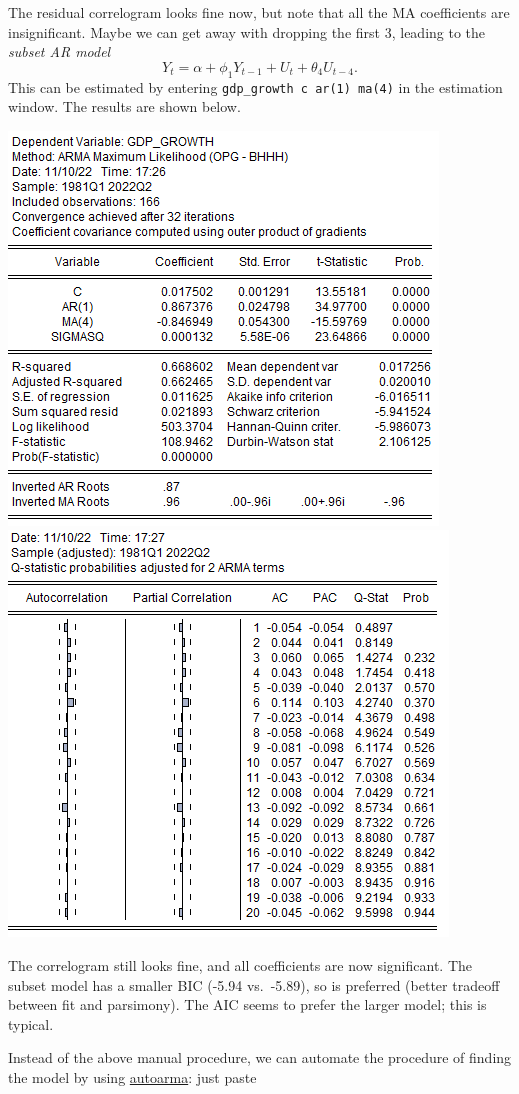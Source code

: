\documentclass[11pt, a4paper]{article}
\begin{document}
\begin{enumerate}
\begin{enumerate}
\begin{center}
\end{center}
The residual correlogram looks fine now, but note that all the MA coefficients are insignificant. Maybe we can get away with dropping the first 3, leading to the \emph{subset AR model}
\[
Y_t= \alpha+\phi_1 Y_{t-1}+ U_t + \theta_4 U_{t-4}.
\]
This can be estimated by entering \verb.gdp_growth c ar(1) ma(4). in the estimation window. The results are shown below.
\begin{center}
\includegraphics[width=.6\textwidth]{arma14subset_gdpg}
\includegraphics[width=.6\textwidth]{corr_arma14subset_gdpg}
\end{center}
The correlogram still looks fine, and all coefficients are now significant. The subset model has a smaller BIC (-5.94 vs.\ -5.89), so is preferred (better tradeoff between fit and parsimony). The AIC seems to prefer the larger model; this is typical.

Instead of the above manual procedure, we can automate the procedure of finding the model by using \href{https://www.eviews.com/help/helpintro.html#page/content%2Fseriescmd-autoarma.html}{autoarma}: just paste


\end{enumerate}
\end{enumerate}
\end{document}
